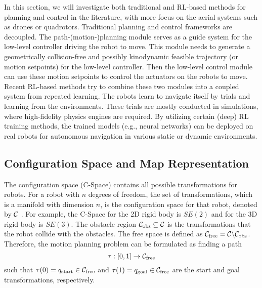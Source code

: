 \documentclass[letterpaper,journal,twoside]{IEEEtran}
\begin{document}
In this section, we will investigate both traditional 
and RL-based methods for planning and control in the 
literature, with more focus on the aerial systems 
such as drones or quadrotors.
Traditional planning and control frameworks are decoupled.
The path-(motion-)planning module serves as a guide system 
for the low-level controller driving the robot to move. 
This module needs to generate a geometrically 
collision-free and possibly kinodynamic feasible trajectory 
(or motion setpoints) for the low-level controller.
Then the low-level control module can use these motion 
setpoints to control the actuators on the robots to move.
Recent RL-based methods try to combine these two modules 
into a coupled system from repeated learning. 
The robots learn to navigate itself by trials and learning 
from the environments.
These trials are mostly conducted in simulations, 
where high-fidelity physics engines are required. 
By utilizing certain (deep) RL training methods, 
the trained models (e.g., neural networks) can be deployed 
on real robots for autonomous navigation in various static 
or dynamic environments.

\subsection{Configuration Space and Map Representation}
The configuration space (C-Space) contains all possible transformations
for robots. 
For a robot with $n$ degrees of freedom, the set of 
transformations, which is a manifold with dimension $n$, is 
the configuration space for that robot, denoted by $\mathcal{C}$
\cite{quan2020survey}. 
For example, the C-Space for the 2D rigid body is $SE(2)$ 
and for the 3D rigid body is $SE(3)$.
The obstacle region $\mathcal{C}_{\text{obs}} \subseteq \mathcal{C}$ 
is the transformations that the robot collide with the obstacles. 
The free space is defined as $\mathcal{C}_{\text{free}} = 
\mathcal{C} \backslash \mathcal{C}_{\text{obs}}$.
Therefore, the motion planning problem can be formulated as 
finding a path 
\begin{equation}
  \tau : \left[0,1\right]\rightarrow \mathcal{C}_{\text{free}}
\end{equation}
such that $\tau(0) = q_{\text{start}} 
\in \mathcal{C}_{\text{free}}$ and 
$\tau(1) = q_{\text{goal}} \in \mathcal{C}_{\text{free}}$
are the start and goal transformations, respectively.
\end{document}
